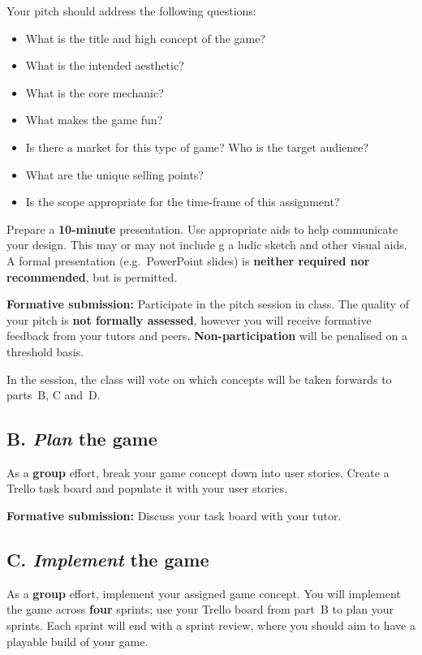 \documentclass{../fal_assignment}
\begin{document}
Your pitch should address the following questions:
\begin{itemize}
	\item What is the title and high concept of the game?
	\item What is the intended aesthetic?
	\item What is the core mechanic? 
	\item What makes the game fun?
	\item Is there a market for this type of game? Who is the target audience?
	\item What are the unique selling points?
	\item Is the scope appropriate for the time-frame of this assignment?
\end{itemize}

Prepare a \textbf{10-minute} presentation.
Use appropriate aids to help communicate your design. This may or may not include g a ludic sketch 
and other visual aids. A formal presentation
(e.g.\ PowerPoint slides) is \textbf{neither required nor recommended}, but is permitted. 

\textbf{Formative submission:} Participate in the pitch session in class.
The quality of your pitch is \textbf{not formally assessed},
however you will receive formative feedback from your tutors and peers.
\textbf{Non-participation} will be penalised on a threshold basis.

In the session, the class will vote on which concepts will be taken forwards to parts~B, C and~D.

\subsection*{B. \emph{Plan} the game}

As a \textbf{group} effort, break your game concept down into user stories.
Create a Trello task board and populate it with your user stories.

\textbf{Formative submission:} Discuss your task board with your tutor.

\subsection*{C. \emph{Implement} the game}

As a \textbf{group} effort, implement your assigned game concept.
You will implement the game across \textbf{four} sprints;
use your Trello board from part~B to plan your sprints.
Each sprint will end with a sprint review, where you should aim to have a playable build of your game.
\end{document}

